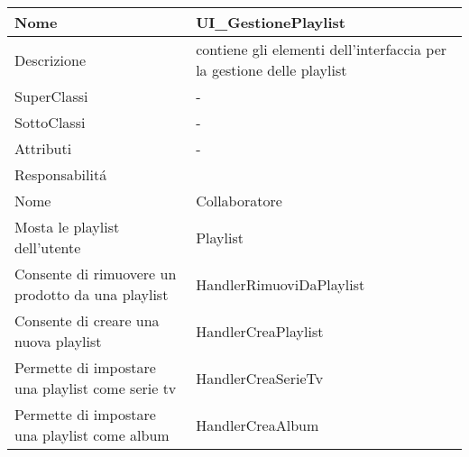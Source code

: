 \begin{center} %
    \begin{longtable}{ |p{3cm}|p{3cm}|p{3cm}|p{3cm}| }
        \hline
        Nome & \multicolumn{3}{|p{9cm}|}{UI\_GestionePlaylist} \\\hline
        Descrizione & \multicolumn{3}{|p{9cm}|}{contiene gli elementi dell'interfaccia per la gestione delle playlist} \\\hline
        SuperClassi & \multicolumn{3}{|p{9cm}|}{-} \\\hline
        SottoClassi & \multicolumn{3}{|p{9cm}|}{-} \\\hline
        Attributi & \multicolumn{3}{|p{9cm}|}{-} \\\hline
        \multicolumn{4}{|p{12cm}|}{Responsabilit\'a} \\\hline %
        \multicolumn{2}{|p{6cm}|}{Nome} & \multicolumn{2}{|p{6cm}|}{Collaboratore} \\\hline
        \multicolumn{2}{|p{6cm}|}{Mosta le playlist dell'utente} & \multicolumn{2}{|p{6cm}|}{Playlist} \\\hline
        \multicolumn{2}{|p{6cm}|}{Consente di rimuovere un prodotto da una playlist} & \multicolumn{2}{|p{6cm}|}{HandlerRimuoviDaPlaylist} \\\hline
        \multicolumn{2}{|p{6cm}|}{Consente di creare una nuova playlist} & \multicolumn{2}{|p{6cm}|}{HandlerCreaPlaylist} \\\hline
        \multicolumn{2}{|p{6cm}|}{Permette di impostare una playlist come serie tv} & \multicolumn{2}{|p{6cm}|}{HandlerCreaSerieTv} \\\hline
        \multicolumn{2}{|p{6cm}|}{Permette di impostare una playlist come album} & \multicolumn{2}{|p{6cm}|}{HandlerCreaAlbum} \\\hline
    \end{longtable}
\end{center}

